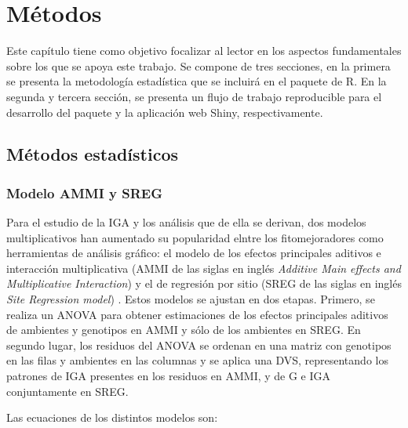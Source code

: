 
\chapter{Métodos}
Este capítulo tiene como objetivo focalizar al lector en los aspectos fundamentales sobre los que se apoya este trabajo. Se compone de tres secciones, en la primera se presenta la metodología estadística que se incluirá en el paquete de R.  En la segunda y tercera sección, se presenta un flujo de trabajo reproducible para el desarrollo del paquete y la aplicación web Shiny, respectivamente.



\section{Métodos estadísticos}

\subsection{Modelo AMMI y SREG}
Para el estudio de la IGA y los análisis que de ella se derivan, dos modelos multiplicativos han aumentado su popularidad elntre los fitomejoradores como herramientas de análisis gráfico: el modelo de los efectos principales aditivos e interacción multiplicativa (AMMI de las siglas en inglés \emph{Additive Main effects and Multiplicative Interaction}) \citep{Kempton1984,Gauch1988} y el de regresión por sitio (SREG de las siglas en inglés \emph{Site Regression model}) \citep{Corneliusetal1996, CrossaCornelius1997}. Estos modelos se ajustan en dos etapas. Primero, se realiza un ANOVA para obtener estimaciones de los efectos principales aditivos de ambientes y genotipos en AMMI y sólo de los ambientes en SREG. En segundo lugar, los residuos del ANOVA se ordenan en una matriz con genotipos en las filas y ambientes en las columnas y se aplica una DVS, representando los patrones de IGA presentes en los residuos en AMMI, y de G e IGA conjuntamente en SREG.

Las ecuaciones de los distintos modelos son:

